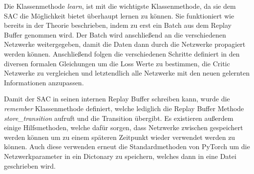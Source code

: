 \documentclass[]{iat}
\begin{document}
Die Klassenmethode \textit{learn}, ist mit die wichtigste Klassenmethode, da sie dem SAC die Möglichkeit bietet überhaupt lernen zu können. Sie funktioniert wie bereits in der Theorie beschrieben, indem zu erst ein Batch aus dem Replay Buffer genommen wird. Der Batch wird anschließend an die verschiedenen Netzwerke weitergegeben, damit die Daten dann durch die Netzwerke propagiert werden können. Anschließend folgen die verschiedenen Schritte definiert in den diversen formalen Gleichungen um die Loss Werte zu bestimmen, die Critic Netzwerke zu vergleichen und letztendlich alle Netzwerke mit den neuen gelernten Informationen anzupassen.

Damit der SAC in seinen internen Replay Buffer schreiben kann, wurde die \textit{remember} Klassenmethode definiert, welche lediglich die Replay Buffer Methode \textit{store\_transition} aufruft und die Transition übergibt. Es existieren außerdem einige Hilfsmethoden, welche dafür sorgen, dass Netzwerke zwischen gespeichert werden können um zu einem späteren Zeitpunkt wieder verwendet werden zu können. Auch diese verwenden erneut die Standardmethoden von PyTorch um die Netzwerkparameter in ein Dictonary zu speichern, welches dann in eine Datei geschrieben wird.
\end{document}
